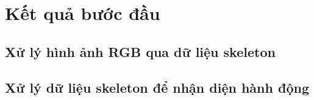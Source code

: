 \section{Kết quả bước đầu}
\subsection{Xử lý hình ảnh RGB qua dữ liệu skeleton}

\subsection{Xử lý dữ liệu skeleton để nhận diện hành động}


